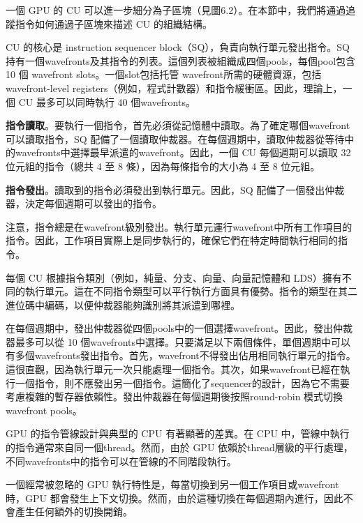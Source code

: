 \vspace{1em}
一個 GPU 的 CU 可以進一步細分為子區塊（見圖6.2）。在本節中，我們將通過追蹤指令如何通過子區塊來描述 CU 的組織結構。

\vspace{1em}
CU 的核心是 instruction sequencer block（SQ），負責向執行單元發出指令。SQ 持有一個wavefronts及其指令的列表。這個列表被組織成四個pools，每個pool包含 10 個 wavefront slots。一個slot包括托管 wavefront所需的硬體資源，包括wavefront-level registers（例如，程式計數器）和指令緩衝區。因此，理論上，一個 CU 最多可以同時執行 40 個wavefronts。

\vspace{1em}
\textbf{指令讀取}。要執行一個指令，首先必須從記憶體中讀取。為了確定哪個wavefront可以讀取指令，SQ 配備了一個讀取仲裁器。在每個週期中，讀取仲裁器從等待中的wavefronts中選擇最早派遣的wavefront。因此，一個 CU 每個週期可以讀取 32 位元組的指令（總共 4 至 8 條），因為每條指令的大小為 4 至 8 位元組。

\vspace{1em}
\textbf{指令發出}。讀取到的指令必須發出到執行單元。因此，SQ 配備了一個發出仲裁器，決定每個週期可以發出的指令。

\vspace{1em}
注意，指令總是在wavefront級別發出。執行單元運行wavefront中所有工作項目的指令。因此，工作項目實際上是同步執行的，確保它們在特定時間執行相同的指令。

\vspace{1em}
每個 CU 根據指令類別（例如，純量、分支、向量、向量記憶體和 LDS）擁有不同的執行單元。這在不同指令類型可以平行執行方面具有優勢。指令的類型在其二進位碼中編碼，以便仲裁器能夠識別將其派遣到哪裡。

\vspace{1em}
在每個週期中，發出仲裁器從四個pools中的一個選擇wavefront。因此，發出仲裁器最多可以從 10 個wavefronts中選擇。只要滿足以下兩個條件，單個週期中可以有多個wavefronts發出指令。首先，wavefront不得發出佔用相同執行單元的指令。這很直觀，因為執行單元一次只能處理一個指令。其次，如果wavefront已經在執行一個指令，則不應發出另一個指令。這簡化了sequencer的設計，因為它不需要考慮複雜的暫存器依賴性。發出仲裁器在每個週期後按照round-robin 模式切換wavefront pools。

\vspace{1em}
GPU 的指令管線設計與典型的 CPU 有著顯著的差異。在 CPU 中，管線中執行的指令通常來自同一個thread。然而，由於 GPU 依賴於thread層級的平行處理，不同wavefronts中的指令可以在管線的不同階段執行。

\vspace{1em}
一個經常被忽略的 GPU 執行特性是，每當切換到另一個工作項目或wavefront時，GPU 都會發生上下文切換。然而，由於這種切換在每個週期內進行，因此不會產生任何額外的切換開銷。

